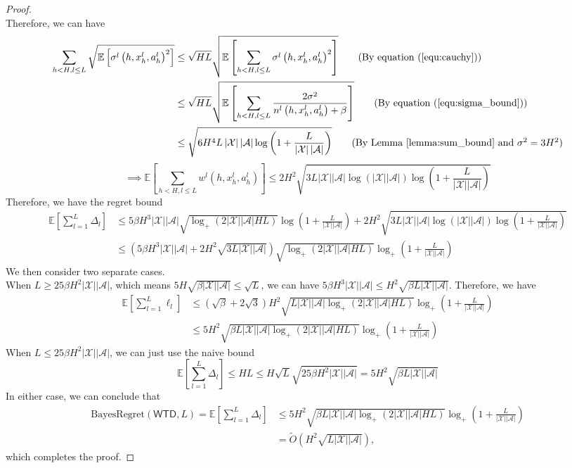 \documentclass[letterpaper]{article} %
\newcommand{\Sp}[1]{\left(#1\right)}
\newcommand{\Mp}[1]{\left[#1\right]}
\newcommand{\abs}[1]{\left|#1\right|}
\newcommand{\E}{\mathbb{E}}
\newcommand{\aX}{\abs{\mathcal{X}}}
\newcommand{\aA}{\abs{\mathcal{A}}}
\theoremstyle{definition}
\begin{document}
\begin{proof}
\begin{equation}
\end{equation}
Therefore, we can have
\begin{align*}
	\sum_{h<H, l\leq L}\sqrt{\E\Mp{\sigma^l\Sp{h, x_h^l, a_h^l}^2}}&\leq\sqrt{HL}\sqrt{\E\Mp{\sum_{h<H, l\leq L}\sigma^l\Sp{h, x_h^l, a_h^l}^2}}\tag{By equation (\ref{equ:cauchy})}\\
	&\leq\sqrt{HL}\sqrt{\E\Mp{\sum_{h<H, l\leq L}\frac{2\sigma^2}{n^l\Sp{h, x_h^l, a_h^l}+\beta}}}\tag{By equation (\ref{equ:sigma_bound})}\\
	&\leq \sqrt{6H^4L\aX\aA\log\Sp{1+\frac{L}{\aX\aA}}}\tag{By Lemma \ref{lemma:sum_bound} and $\sigma^2=3H^2$}
\end{align*}
$$\implies \E\Mp{\sum_{h<H, l\leq L}w^l\Sp{h, x_h^l, a_h^l}}\leq 2H^2\sqrt{3L\aX\aA\log\Sp{\aX\aA}\log\Sp{1+\frac{L}{\aX\aA}}}$$
Therefore, we have the regret bound
\begin{align*}
	\E\Mp{\sum_{l=1}^{L}\Delta_l}&\leq 5\beta H^3\aX\aA\sqrt{\log_+\Sp{2\aX\aA HL}}\log\Sp{1+\frac{L}{\aX\aA}}+2H^2\sqrt{3L\aX\aA\log\Sp{\aX\aA}\log\Sp{1+\frac{L}{\aX\aA}}}\\
	&\leq\Sp{5\beta H^3\aX\aA+2H^2\sqrt{3L\aX\aA}}\sqrt{\log_+\Sp{2\aX\aA HL}}\log_+\Sp{1+\frac{L}{\aX\aA}}
\end{align*}
We then consider two separate cases. \\ 
When $L\geq 25\beta H^2\aX\aA$, which means $5H\sqrt{\beta\aX\aA}\leq \sqrt{L}$, we can have $5\beta H^3\aX\aA\leq H^2\sqrt{\beta L\aX\aA}$. Therefore, we have
\begin{align*}
	\E\Mp{\sum_{l=1}^{L}\ell_l}&\leq\Sp{\sqrt{\beta}+2\sqrt{3}}H^2\sqrt{L\aX\aA\log_+\Sp{2\aX\aA HL}}\log_+\Sp{1+\frac{L}{\aX\aA}}\\
	&\leq 5H^2\sqrt{\beta L\aX\aA\log_+\Sp{2\aX\aA HL}}\log_+\Sp{1+\frac{L}{\aX\aA}}
\end{align*}
When $L\leq 25\beta H^2\aX\aA$, we can just use the naive bound
$$\E\Mp{\sum_{l=1}^{L}\Delta_l}\leq HL\leq H\sqrt{L}\sqrt{25\beta H^2\aX\aA}=5H^2\sqrt{\beta L\aX\aA}$$
In either case, we can conclude that
\begin{align*}
    \mathrm{BayesRegret}\Sp{\mathsf{WTD}, L}=\E\Mp{\sum_{l=1}^{L}\Delta_l}&\leq 5H^2\sqrt{\beta L\aX\aA\log_+\Sp{2\aX\aA HL}}\log_+\Sp{1+\frac{L}{\aX\aA}}\\
    &= \widetilde{O}\Sp{H^2 \sqrt{L\aX\aA}},
\end{align*}
which completes the proof.
\end{proof}
\end{document}
